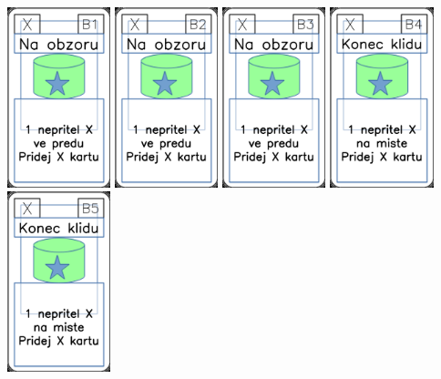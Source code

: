 \documentclass[a4paper]{article}
\begin{document}
	\includegraphics[width=3.0cm]{img-5_5}
	\includegraphics[width=3.0cm]{img-5_6}
	\includegraphics[width=3.0cm]{img-5_7}
	\includegraphics[width=3.0cm]{img-5_8}
	\includegraphics[width=3.0cm]{img-5_9}
\end{document}
